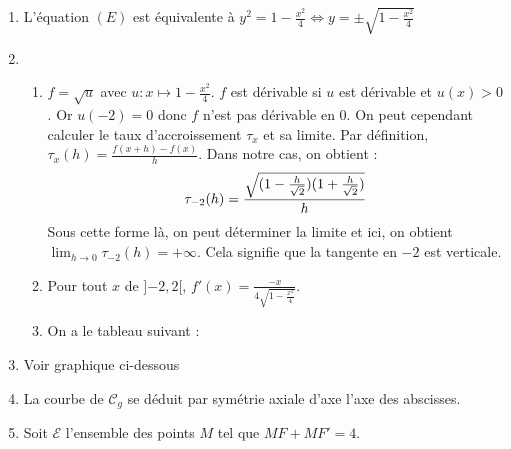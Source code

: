 \documentclass[12pt,a4paper,french]{article}
\begin{document}
\begin{solution}
	\begin{enumerate}
    	\item L'équation $(E)$ est équivalente à $y^2 = 1 - \frac{x^2}4
        \iff y = \pm\sqrt{1 - \frac{x^2}4}$
        \item 
        \begin{enumerate}
        \item $f = \sqrt{u}$ avec $u \colon x \mapsto 1 - \frac{x^2}4$.
        $f$ est dérivable si $u$ est dérivable et $u(x) > 0$. Or $u(-2) = 
        0$ donc $f$ n'est pas dérivable en 0. On peut cependant calculer le taux
        d'accroissement $\tau_x$ et sa  limite. Par définition, $\tau_x(h) =
        \frac{f(x+h) - f(x)}{h}$. Dans notre cas, on obtient : \[\tau_{-2}(h) = 
        \frac{\sqrt{\brk*{1-\frac{h}{\sqrt{2}}}\brk*{1+\frac{h}{\sqrt{2}}}}}{h} \]
        Sous cette forme là, on peut déterminer la limite et ici, on obtient $\lim_{h\to 
        0}\tau_{-2}(h) = +\infty$. Cela signifie que la tangente en $-2$ est verticale.
        
        \item Pour tout $x$ de ${]{-2},2[}$, $f'(x) = \frac{-x}{4\sqrt{1 -
        \frac{x^2}4}}$.
        \item On a le tableau suivant :
        \begin{center}
        \end{center}
        \end{enumerate}
        \item Voir graphique ci-dessous
        
        \begin{center}
\end{center}
\item La courbe de $\mathscr{C}_g$ se déduit par symétrie axiale d'axe l'axe des abscisses.
\item Soit $\mathcal{E}$ l'ensemble des points $M$ tel que $MF+MF'=4$.


\end{enumerate}
\end{solution}
\end{document}

